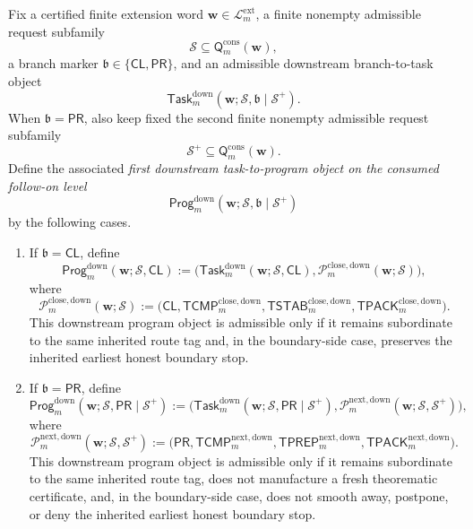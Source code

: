 \begin{definition}
\label{def:first-downstream-task-to-program-object-on-the-consumed-follow-on-level}
Fix a certified finite extension word \(\mathbf w\in\mathcal L^{\mathrm{ext}}_{m}\), a finite nonempty admissible request subfamily
\[
  \mathcal S \subseteq \mathsf{Q}^{\mathrm{cons}}_{m}(\mathbf w),
\]
a branch marker \(\mathfrak b\in\{\mathsf{CL},\mathsf{PR}\}\), and an admissible downstream branch-to-task object
\[
  \mathsf{Task}^{\mathrm{down}}_{m}(\mathbf w;\mathcal S,\mathfrak b\mid\mathcal S^{+}).
\]
When \(\mathfrak b=\mathsf{PR}\), also keep fixed the second finite nonempty admissible request subfamily
\[
  \mathcal S^{+}\subseteq \mathsf{Q}^{\mathrm{cons}}_{m}(\mathbf w).
\]
Define the associated \emph{first downstream task-to-program object on the consumed follow-on level}
\[
  \mathsf{Prog}^{\mathrm{down}}_{m}(\mathbf w;\mathcal S,\mathfrak b\mid\mathcal S^{+})
\]
by the following cases.
\begin{enumerate}[label=(\roman*)]
  \item If \(\mathfrak b=\mathsf{CL}\), define
\[
  \mathsf{Prog}^{\mathrm{down}}_{m}(\mathbf w;\mathcal S,\mathsf{CL})
  :=
  \bigl(\mathsf{Task}^{\mathrm{down}}_{m}(\mathbf w;\mathcal S,\mathsf{CL}),\mathcal P^{\mathrm{close,down}}_{m}(\mathbf w;\mathcal S)\bigr),
\]
where
\[
  \mathcal P^{\mathrm{close,down}}_{m}(\mathbf w;\mathcal S)
  :=
  \bigl(\mathsf{CL},\mathsf{TCMP}^{\mathrm{close,down}}_{m},\mathsf{TSTAB}^{\mathrm{close,down}}_{m},\mathsf{TPACK}^{\mathrm{close,down}}_{m}\bigr).
\]
This downstream program object is admissible only if it remains subordinate to the same inherited route tag and, in the boundary-side case, preserves the inherited earliest honest boundary stop.

  \item If \(\mathfrak b=\mathsf{PR}\), define
\[
  \mathsf{Prog}^{\mathrm{down}}_{m}(\mathbf w;\mathcal S,\mathsf{PR}\mid\mathcal S^{+})
  :=
  \bigl(\mathsf{Task}^{\mathrm{down}}_{m}(\mathbf w;\mathcal S,\mathsf{PR}\mid\mathcal S^{+}),\mathcal P^{\mathrm{next,down}}_{m}(\mathbf w;\mathcal S,\mathcal S^{+})\bigr),
\]
where
\[
  \mathcal P^{\mathrm{next,down}}_{m}(\mathbf w;\mathcal S,\mathcal S^{+})
  :=
  \bigl(\mathsf{PR},\mathsf{TCMP}^{\mathrm{next,down}}_{m},\mathsf{TPREP}^{\mathrm{next,down}}_{m},\mathsf{TPACK}^{\mathrm{next,down}}_{m}\bigr).
\]
This downstream program object is admissible only if it remains subordinate to the same inherited route tag, does not manufacture a fresh theorematic certificate, and, in the boundary-side case, does not smooth away, postpone, or deny the inherited earliest honest boundary stop.
\end{enumerate}
\end{definition}

